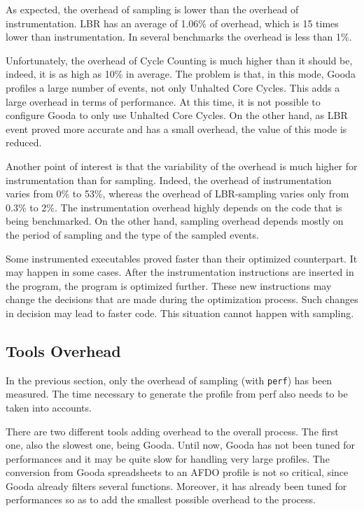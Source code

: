 \documentclass[9pt,english,twocolumn,letter]{article}
\begin{document}
As expected, the overhead of sampling is lower than the overhead of instrumentation. LBR has an average of 1.06\% of overhead, which is 15 times lower than instrumentation. In several benchmarks the overhead is less than 1\%.

Unfortunately, the overhead of Cycle Counting is much higher than it should be, indeed, it is as high as 10\% in average. The problem is that, in this mode, Gooda profiles a large number of events, not only Unhalted Core Cycles. This adds a large overhead in terms of performance. At this time, it is not possible to configure Gooda to only use Unhalted Core Cycles. On the other hand, as LBR event proved more accurate and has a small overhead, the value of this mode is reduced.

Another point of interest is that the variability of the overhead is much higher for instrumentation than for sampling. Indeed, the overhead of instrumentation varies from 0\% to 53\%, whereas the overhead of LBR-sampling varies only from 0.3\% to 2\%. The instrumentation overhead highly depends on the code that is being benchmarked. On the other hand, sampling overhead depends mostly on the period of sampling and the type of the sampled events.

Some instrumented executables proved faster than their optimized counterpart. It may happen in some cases. After the instrumentation instructions are inserted in the program, the program is optimized further. These new instructions may change the decisions that are made during the optimization process. Such changes in decision may lead to faster code. This situation cannot happen with sampling.

\subsection{Tools Overhead}

In the previous section, only the overhead of sampling (with \texttt{perf}) has been measured. The time necessary to generate the profile from perf also needs to be taken into accounts.

There are two different tools adding overhead to the overall process. The first one, also the slowest one, being Gooda. Until now, Gooda has not been tuned for performances and it may be quite slow for handling very large profiles. The conversion from Gooda spreadsheets to an AFDO profile is not so critical, since Gooda already filters several functions. Moreover, it has already been tuned for performances so as to add the smallest possible overhead to the process.
\end{document}
